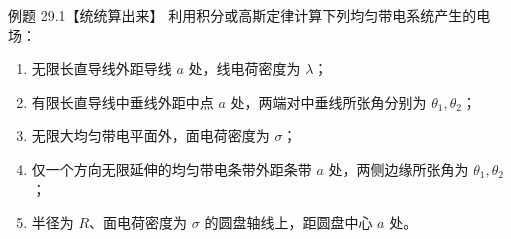 \Needspace{0.45\textheight}
\begin{origexamplebox}{例题 29.1【统统算出来】}
利用积分或高斯定律计算下列均匀带电系统产生的电场：
\begin{enumerate}[label=(\arabic*),leftmargin=2.2em]
  \item 无限长直导线外距导线 $a$ 处，线电荷密度为 $\lambda$；
  \item 有限长直导线中垂线外距中点 $a$ 处，两端对中垂线所张角分别为 $\theta_1,\theta_2$；
  \item 无限大均匀带电平面外，面电荷密度为 $\sigma$；
  \item 仅一个方向无限延伸的均匀带电条带外距条带 $a$ 处，两侧边缘所张角为
  $\theta_1,\theta_2$；
  \item 半径为 $R$、面电荷密度为 $\sigma$ 的圆盘轴线上，距圆盘中心 $a$ 处。
\end{enumerate}
\finiteLineDiagram
\end{origexamplebox}

